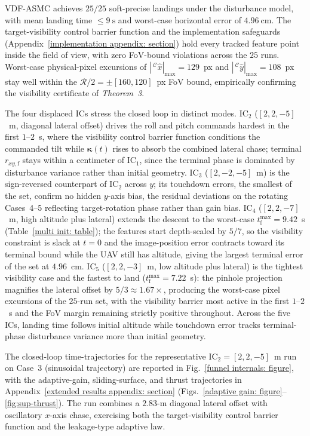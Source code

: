 \documentclass{IEEEtaes}
\begin{document}
VDF-ASMC achieves $25/25$ soft-precise landings under the disturbance model, with mean landing time $\le 9~\text{s}$ and worst-case horizontal error of $4.96~\text{cm}$. The target-visibility control barrier function and the implementation safeguards (Appendix~\ref{implementation appendix: section}) hold every tracked feature point inside the field of view, with zero FoV-bound violations across the $25$ runs. Worst-case physical-pixel excursions of $|\,^\mathcal{C}\hat{x}|_{\max}=129$~px and $|\,^\mathcal{C}\hat{y}|_{\max}=108$~px stay well within the $\mathcal{R}/2=\pm[160,120]$~px FoV bound, empirically confirming the visibility certificate of \textit{Theorem~3}.

The four displaced ICs stress the closed loop in distinct modes. IC$_2$ ($[2,2,-5]$~m, diagonal lateral offset) drives the roll and pitch commands hardest in the first $1$--$2$~s, where the visibility control barrier function conditions the commanded tilt while $\boldsymbol{\kappa}(t)$ rises to absorb the combined lateral chase; terminal $r_{xy,\text{f}}$ stays within a centimeter of IC$_1$, since the terminal phase is dominated by disturbance variance rather than initial geometry. IC$_3$ ($[2,-2,-5]$~m) is the sign-reversed counterpart of IC$_2$ across $y$; its touchdown errors, the smallest of the set, confirm no hidden $y$-axis bias, the residual deviations on the rotating Cases~4--5 reflecting target-rotation phase rather than gain bias. IC$_4$ ($[2,2,-7]$~m, high altitude plus lateral) extends the descent to the worst-case $t_\text{f}^{\max}=9.42$~s (Table~\ref{multi init: table}); the features start depth-scaled by $5/7$, so the visibility constraint is slack at $t=0$ and the image-position error contracts toward its terminal bound while the UAV still has altitude, giving the largest terminal error of the set at $4.96$~cm. IC$_5$ ($[2,2,-3]$~m, low altitude plus lateral) is the tightest visibility case and the fastest to land ($t_\text{f}^{\max}=7.22$~s): the pinhole projection magnifies the lateral offset by $5/3\approx 1.67\times$, producing the worst-case pixel excursions of the $25$-run set, with the visibility barrier most active in the first $1$--$2$~s and the FoV margin remaining strictly positive throughout. Across the five ICs, landing time follows initial altitude while touchdown error tracks terminal-phase disturbance variance more than initial geometry.

The closed-loop time-trajectories for the representative IC$_2=[2,2,-5]$~m run on Case~3 (sinusoidal trajectory) are reported in Fig.~\ref{funnel internals: figure}, with the adaptive-gain, sliding-surface, and thrust trajectories in Appendix~\ref{extended results appendix: section} (Figs.~\ref{adaptive gain: figure}--\ref{fig:sup-thrust}). The run combines a $2.83$-m diagonal lateral offset with oscillatory $x$-axis chase, exercising both the target-visibility control barrier function and the leakage-type adaptive law.
\end{document}
